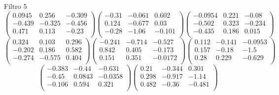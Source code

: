 Filtro 5
{ \small
\[
\begin{pmatrix}
  0.0945 & 0.256 & -0.309 \\
  -0.439 & -0.325 & -0.456 \\
  0.471 & 0.113 & -0.23 \\
\end{pmatrix}
\begin{pmatrix}
  -0.31 & -0.061 & 0.602 \\
  0.124 & -0.677 & 0.03 \\
  -0.28 & -1.06 & -0.101 \\
\end{pmatrix}
\begin{pmatrix}
  -0.0954 & 0.221 & -0.08 \\
  -0.502 & 0.323 & -0.234 \\
  -0.435 & 0.186 & 0.015 \\
\end{pmatrix}
\]
\[
\begin{pmatrix}
  0.324 & 0.103 & 0.296 \\
  -0.202 & 0.186 & 0.582 \\
  -0.274 & -0.575 & 0.404 \\
\end{pmatrix}
\begin{pmatrix}
  -0.241 & -0.714 & -0.527 \\
  0.842 & 0.405 & -0.173 \\
  0.151 & 0.351 & -0.0172 \\
\end{pmatrix}
\begin{pmatrix}
  0.112 & -0.141 & -0.0953 \\
  0.157 & -0.18 & -1.5 \\
  0.28 & 0.229 & -0.629 \\
\end{pmatrix}
\]
\[
\begin{pmatrix}
  -0.383 & -0.44 & -0.631 \\
  -0.45 & 0.0843 & -0.0358 \\
  -0.106 & 0.594 & 0.321 \\
\end{pmatrix}
\begin{pmatrix}
  0.21 & -0.344 & 0.301 \\
  0.298 & -0.917 & -1.14 \\
  0.482 & -0.36 & -0.481 \\
\end{pmatrix}
\]
}

